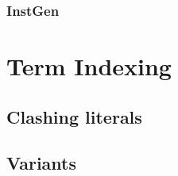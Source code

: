 \subsubsection{InstGen}

\section{Term Indexing}

\subsection{Clashing literals}

\subsection{Variants}



